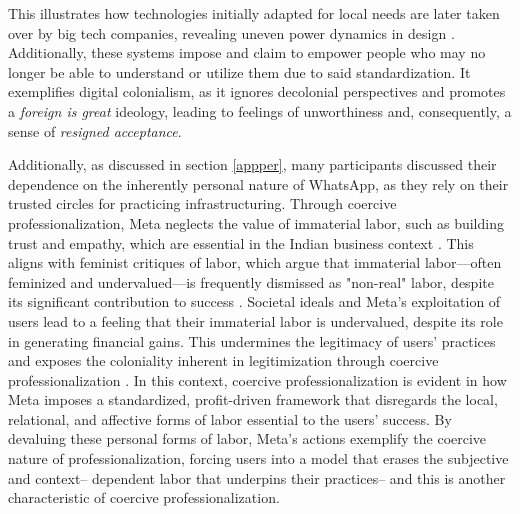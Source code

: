 This illustrates how technologies initially adapted for local needs are later taken over by big tech companies, revealing uneven power dynamics in design \cite{10.1145/3630106.3658934, 10.1145/3637316, 10.1145/1753326.1753522}. Additionally, these systems impose and claim to empower people who may no longer be able to understand or utilize them due to said standardization. It exemplifies digital colonialism, as it ignores decolonial perspectives and promotes a \textit{foreign is great} ideology, leading to feelings of unworthiness \cite{oji2020digital} and, consequently, a sense of \textit{resigned acceptance}. 





Additionally, as discussed in section \ref{appper}, many participants discussed their dependence on the inherently personal nature of WhatsApp, as they rely on their trusted circles for practicing infrastructuring. Through coercive professionalization, Meta neglects the value of immaterial labor, such as building trust and empathy, which are essential in the Indian business context \cite{berger2020doing}. This aligns with feminist critiques of labor, which argue that immaterial labor—often feminized and undervalued—is frequently dismissed as "non-real" labor, despite its significant contribution to success \cite{oksala2016affective, terranova2012free}. Societal ideals and Meta’s exploitation of users lead to a feeling that their immaterial labor is undervalued, despite its role in generating financial gains. This undermines the legitimacy of users' practices and exposes the coloniality inherent in legitimization through coercive professionalization \cite{wyrtzen2017}. In this context, coercive professionalization is evident in how Meta imposes a standardized, profit-driven framework that disregards the local, relational, and affective forms of labor essential to the users' success. By devaluing these personal forms of labor, Meta's actions exemplify the coercive nature of professionalization, forcing users into a model that erases the subjective and context-- dependent labor that underpins their practices-- and this is another characteristic of coercive professionalization.





